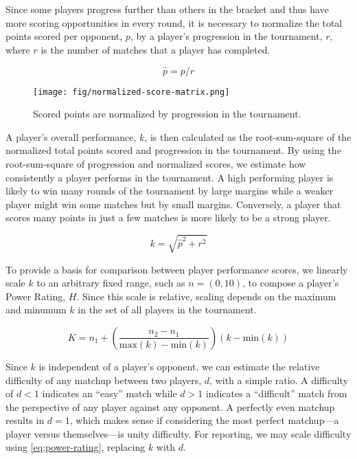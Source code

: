 \documentclass[letterpaper, 10 pt, conference]{ieeeconf}  %
\begin{document}
Since some players progress further than others in the bracket and thus have more scoring opportunities in every round, it is necessary to normalize the total points scored per opponent, $p$, by a player's progression in the tournament, $r$, where $r$ is the number of matches that a player has completed. 

\begin{equation}
        \hat{p} = p/r
        \label{eq:normalized-score}
\end{equation}

\begin{figure}[ht]
        \texttt{[image: fig/normalized-score-matrix.png]}
        \label{fig:normalized-score}
        \centering
        \caption{Scored points are normalized by progression in the tournament.}
\end{figure}

A player's overall performance, $k$, is then calculated as the root-sum-square of the normalized total points scored and progression in the tournament. 
By using the root-sum-square of progression and normalized scores, we estimate how consistently a player performs in the tournament.
A high performing player is likely to win many rounds of the tournament by large margins while a weaker player might win some matches but by small margins.
Conversely, a player that scores many points in just a few matches is more likely to be a strong player.

\begin{equation}
        k = \sqrt{\hat{p}^2 + r^2}
        \label{eq:skill-indicator}
\end{equation}

To provide a basis for comparison between player performance scores, we linearly scale $k$ to an arbitrary fixed range, such as $n = (0,10)$, to compose a player's Power Rating, $H$. Since this scale is relative, scaling depends on the maximum and minumum $k$ in the set of all players in the tournament.

\begin{equation}
        K = n_1 + \left(\frac{n_2 - n_1}{\text{max}(k) - \text{min}(k)}\right)(k - \text{min}(k))  
        \label{eq:power-rating}
\end{equation}

Since $k$ is independent of a player's opponent, we can estimate the relative difficulty of any matchup between two players, $d$, with a simple ratio.
A difficulty of $d<1$ indicates an ``easy'' match while $d>1$ indicates a ``difficult'' match from the perspective of any player against any opponent.
A perfectly even matchup results in $d=1$, which makes sense if considering the most perfect matchup---a player versus themselves---is unity difficulty. 
For reporting, we may scale difficulty using \autoref{eq:power-rating}, replacing $k$ with $d$. 
\end{document}
